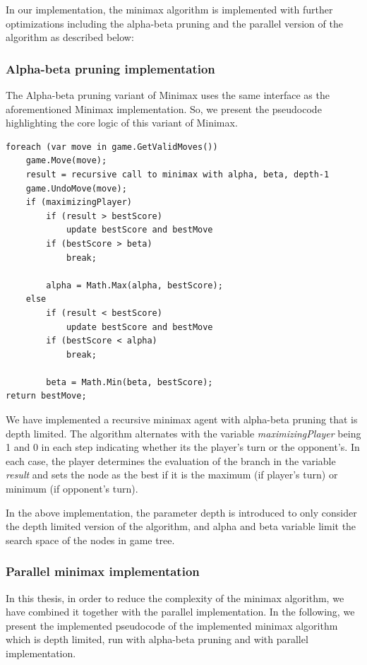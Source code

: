 In our implementation, the minimax algorithm is implemented with further optimizations including the alpha-beta pruning and the parallel version of the algorithm as described below:

\subsubsection{Alpha-beta pruning implementation}
The Alpha-beta pruning variant of Minimax uses the same interface as the aforementioned Minimax implementation. So, we present the pseudocode highlighting the core logic of this variant of Minimax.

\begin{lstlisting}
foreach (var move in game.GetValidMoves())
    game.Move(move);
    result = recursive call to minimax with alpha, beta, depth-1
    game.UndoMove(move);
    if (maximizingPlayer)
        if (result > bestScore)
            update bestScore and bestMove
        if (bestScore > beta)
            break;

        alpha = Math.Max(alpha, bestScore);
    else
        if (result < bestScore)
            update bestScore and bestMove
        if (bestScore < alpha)
            break;

        beta = Math.Min(beta, bestScore);
return bestMove;
\end{lstlisting}

We have implemented a recursive minimax agent with alpha-beta pruning that is depth limited. The algorithm alternates with the variable \textit{maximizingPlayer} being 1 and 0 in each step indicating whether its the player's turn or the opponent's. In each case, the player determines the evaluation of the branch in the variable \textit{result} and sets the node as the best if it is the maximum (if player's turn) or minimum (if opponent's turn).

In the above implementation, the parameter depth is introduced to only consider the depth limited version of the algorithm, and alpha and beta variable limit the search space of the nodes in game tree.

\subsubsection{Parallel minimax implementation}


In this thesis, in order to reduce the complexity of the minimax algorithm, we have combined it together with the parallel implementation. In the following, we present the implemented pseudocode of the implemented minimax algorithm which is depth limited, run with alpha-beta pruning and with parallel implementation. 


